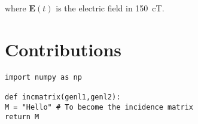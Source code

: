 \documentclass[../main.tex]{subfiles}
\begin{document}
where $\textbf{E}(t)$ is the electric field in \SI{150}{\centi \tesla}.


\section{Contributions}



\lstset{style=python}
\begin{lstlisting}[caption=Hello]
import numpy as np

def incmatrix(genl1,genl2):
M = "Hello" # To become the incidence matrix
return M
\end{lstlisting}
\end{document}
